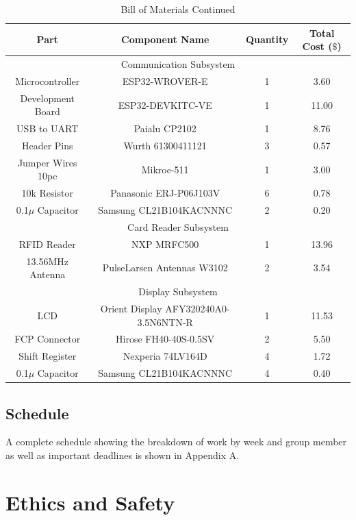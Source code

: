 \documentclass[12pt]{article}
\begin{document}
\begin{table}[!h]
	\caption{Bill of Materials Continued}
	\label{tab:block_comps_cont}
	\centering
	{\small
	\begin{tabular}{ |c|c|c|c| } 
 		\hline
 		\textbf{Part} & \textbf{Component Name} & \textbf{Quantity} & \textbf{Total Cost} ($\$$) \\
 		\hline
 		\hline
 		\multicolumn{4}{|c|}{Communication Subsystem} \\
 		\hline
 		Microcontroller & ESP32-WROVER-E & 1 & 3.60 \\
 		Development Board & ESP32-DEVKITC-VE & 1 & 11.00 \\
 		USB to UART & Paialu CP2102 & 1 & 8.76 \\
 		Header Pins & Wurth 61300411121 & 3 & 0.57 \\
 		Jumper Wires 10pc & Mikroe-511 & 1 & 3.00 \\
 		10k Resistor & Panasonic ERJ-P06J103V & 6 & 0.78 \\
 		0.1$\mu$ Capacitor & Samsung CL21B104KACNNNC & 2 & 0.20 \\
 		\hline
 		\multicolumn{4}{|c|}{Card Reader Subsystem} \\
 		\hline
 		RFID Reader & NXP MRFC500 & 1 & 13.96 \\
 		13.56MHz Antenna & PulseLarsen Antennas W3102 & 2 & 3.54 \\
 		\hline
 		\multicolumn{4}{|c|}{Display Subsystem} \\
 		\hline
 		LCD & Orient Display AFY320240A0-3.5N6NTN-R & 1 & 11.53 \\
 		FCP Connector & Hirose FH40-40S-0.5SV & 2 & 5.50 \\
 		Shift Register & Nexperia 74LV164D & 4 & 1.72 \\
 		0.1$\mu$ Capacitor & Samsung CL21B104KACNNNC & 4 & 0.40 \\
 		\hline
	\end{tabular}
	}
\end{table}

\subsection{Schedule}

A complete schedule showing the breakdown of work by week and group member as well as important deadlines is shown in Appendix A.

\section{Ethics and Safety}
\end{document}
